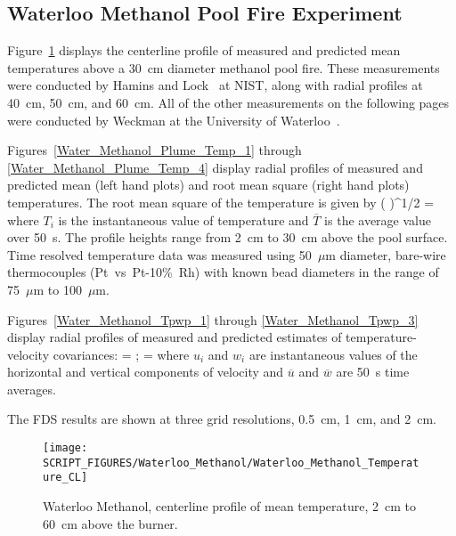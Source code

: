 \clearpage

\subsection{Waterloo Methanol Pool Fire Experiment}
\label{Waterloo_Methanol_Plume_Temps}

Figure~\ref{Water_Methanol_Plume_Temp_CL} displays the centerline profile of measured and predicted mean temperatures above a 30~cm diameter methanol pool fire. These measurements were conducted by Hamins and Lock~\cite{Hamins:TN1928} at NIST, along with radial profiles at 40~cm, 50~cm, and 60~cm. All of the other measurements on the following pages were conducted by Weckman at the University of Waterloo~\cite{Weckman:CF1996}.

Figures~\ref{Water_Methanol_Plume_Temp_1} through \ref{Water_Methanol_Plume_Temp_4} display radial profiles of measured and predicted mean (left hand plots) and root mean square (right hand plots) temperatures. The root mean square of the temperature is given by
\be
   \left(  \right)^{1/2} = 
\ee
where $T_i$ is the instantaneous value of temperature and $\overline{T}$ is the average value over 50~s. The profile heights range from 2~cm to 30~cm above the pool surface. Time resolved temperature data was measured using 50~$\mu$m diameter, bare-wire thermocouples (Pt~vs~Pt-10\%~Rh) with known bead diameters in the range of 75~$\mu$m to 100~$\mu$m.

Figures~\ref{Water_Methanol_Tpwp_1} through \ref{Water_Methanol_Tpwp_3} display radial profiles of measured and predicted estimates of temperature-velocity covariances:
\be
    =   \quad ; \quad {} = 
\ee
where $u_i$ and $w_i$ are instantaneous values of the horizontal and vertical components of velocity and $\overline{u}$ and $\overline{w}$ are 50~s time averages.

The FDS results are shown at three grid resolutions, 0.5~cm, 1~cm, and 2~cm.

\begin{figure}[!ht]
\centering
\texttt{[image: SCRIPT\_FIGURES/Waterloo\_Methanol/Waterloo\_Methanol\_Temperature\_CL]}
\caption[Waterloo Methanol, centerline profile, mean temperature, 2~cm to 60~cm above burner]
{Waterloo Methanol, centerline profile of mean temperature, 2~cm to 60~cm above the burner.}
\label{Water_Methanol_Plume_Temp_CL}
\end{figure}

